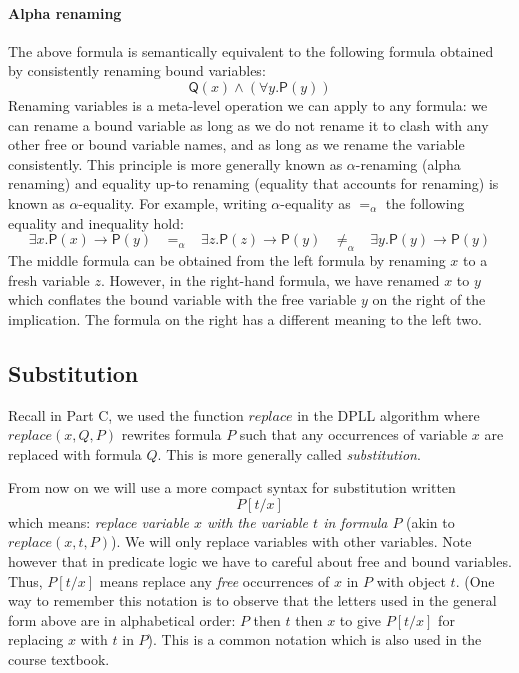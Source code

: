\documentclass{article}
\theoremstyle{definition}
\newcommand{\rel}[1]{\mathsf{#1}}
\begin{document}
\paragraph{Alpha renaming}
The above formula is
semantically equivalent to the following formula obtained by
consistently renaming bound variables:
%
\begin{equation*}
\rel{Q}(x) \wedge (\forall y . \rel{P}(y))
\end{equation*}
%
Renaming variables is a meta-level operation we can apply to any
formula: we can rename a bound variable as long as we do not rename it
to clash with any other free or bound variable names, and as long as
we rename the variable consistently. This principle is more generally
known as $\alpha$-renaming (alpha renaming) and equality up-to
renaming (equality that accounts for renaming) is known as
$\alpha$-equality. For example, writing $\alpha$-equality as
$=_{\alpha}$ the following equality and inequality hold:
%
\begin{equation*}
\exists x . \rel{P}(x) \rightarrow \rel{P}(y)
  \;\;\; =_{\alpha} \;\;\; 
\exists z . \rel{P}(z) \rightarrow \rel{P}(y)
 \;\;\; \neq_{\alpha} \;\;\; \exists y . \rel{P}(y) \rightarrow \rel{P}(y)
\end{equation*}
%
The middle formula can be obtained from the left formula by
renaming $x$ to a fresh variable $z$. However, in the right-hand
formula, we have renamed $x$ to $y$ which conflates the bound
variable with the free variable $y$ on the right of the implication.
The formula on the right has a different meaning to the left two.

\subsection{Substitution}

Recall in Part C, we used the function $\textit{replace}$ in the DPLL
algorithm where $\textit{replace}(x, Q, P)$ rewrites formula $P$ such
that any occurrences of variable $x$ are replaced with formula
$Q$. This is more generally called \emph{substitution}.

From now on we will use a more compact syntax for substitution
written $$P[t/x]$$ which means: \emph{replace variable $x$
with the variable $t$ in formula $P$} (akin to $\textit{replace}(x, t,
P)$). We will only replace variables with other variables.
Note however that in predicate logic we have to careful
about free and bound variables. Thus, $P[t/x]$ means replace any
\emph{free} occurrences of $x$ in $P$ with object $t$. (One way to remember
this notation is to observe that the letters used in the general
form above are in alphabetical order: $P$ then $t$ then $x$ to
give $P[t/x]$ for replacing $x$ with $t$ in $P$).  This is a common
notation which is also used in the course textbook.
\end{document}
